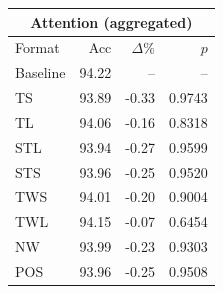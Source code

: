 \begin{tabular}{lrrr}
\toprule
\multicolumn{4}{c}{\textbf{Attention (aggregated)}} \\
\midrule
Format & Acc & $\Delta$\% & $p$ \\
\midrule
Baseline & 94.22 & -- & -- \\
\midrule
TS & 93.89 & -0.33 & 0.9743 \\
TL & 94.06 & -0.16 & 0.8318 \\
STL & 93.94 & -0.27 & 0.9599 \\
STS & 93.96 & -0.25 & 0.9520 \\
TWS & 94.01 & -0.20 & 0.9004 \\
TWL & 94.15 & -0.07 & 0.6454 \\
NW & 93.99 & -0.23 & 0.9303 \\
POS & 93.96 & -0.25 & 0.9508 \\
\bottomrule
\end{tabular}